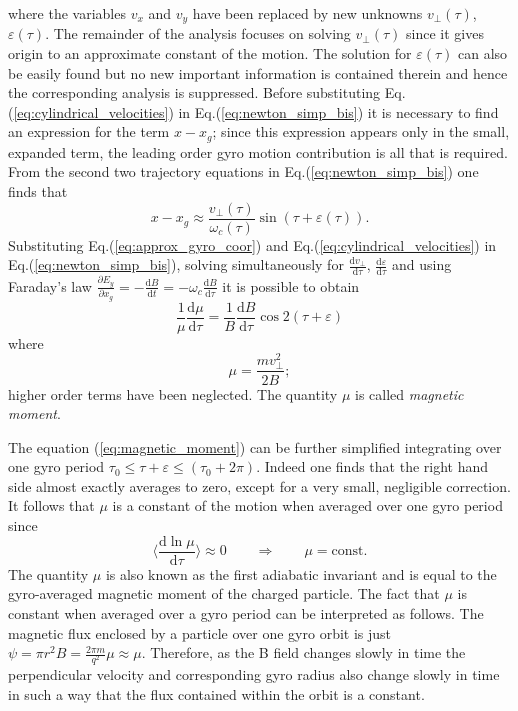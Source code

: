 where the variables $v_x$ and $v_y$ have been replaced by new unknowns $v_{\perp}(\tau)$, $\varepsilon(\tau)$. The remainder of the analysis focuses on solving $v_{\perp}(\tau)$ since it gives origin to an approximate constant of the motion. The solution for $\varepsilon(\tau)$ can also be easily found but no new important information is contained therein and hence the corresponding analysis is suppressed. Before substituting Eq.(\ref{eq:cylindrical_velocities}) in Eq.(\ref{eq:newton_simp_bis}) it is necessary to find an expression for the term $x-x_g$; since this expression appears only in the small, expanded term, the leading order gyro motion contribution is all that is required. From the second two trajectory equations in Eq.(\ref{eq:newton_simp_bis}) one finds that
\begin{equation}\label{eq:approx_gyro_coor}
  x-x_g\approx\frac{v_{\perp}(\tau)}{\omega_c(\tau)}\sin(\tau+\varepsilon(\tau)).
\end{equation}
Substituting Eq.(\ref{eq:approx_gyro_coor}) and Eq.(\ref{eq:cylindrical_velocities}) in Eq.(\ref{eq:newton_simp_bis}), solving simultaneously for $\frac{\mathrm{d}v_{\perp}}{\mathrm{d}\tau}$, $\frac{\mathrm{d}\varepsilon}{\mathrm{d}\tau}$ and using Faraday's law $\frac{\partial E_y}{\partial x_g}=-\frac{\mathrm{d}B}{\mathrm{d}t}=-\omega_c\frac{\mathrm{d}B}{\mathrm{d}\tau}$ it is possible to obtain
\begin{equation}\label{eq:magnetic_moment}
  \frac{1}{\mu}\frac{\mathrm{d}\mu}{\mathrm{d}\tau}=\frac{1}{B}\frac{\mathrm{d}B}{\mathrm{d}\tau}\cos 2(\tau+\varepsilon)
\end{equation}
where
\begin{equation}
  \mu=\frac{mv^2_{\perp}}{2B};
\end{equation}
higher order terms have been neglected. The quantity $\mu$ is called \textit{magnetic moment}.
\medskip

The equation (\ref{eq:magnetic_moment}) can be further simplified integrating over one gyro period $\tau_0\leq\tau +\varepsilon\leq(\tau_0+2\pi)$. Indeed one finds that the right hand side almost exactly averages to zero, except for a very small, negligible correction. It follows that $\mu$ is a constant of the motion when averaged over one gyro period since
\begin{equation}
  \langle\frac{\mathrm{d}\ln\mu}{\mathrm{d}\tau}\rangle\approx0\qquad\Longrightarrow\qquad \mu=\mathrm{const}.
\end{equation}
The quantity $\mu$ is  also known as the first adiabatic invariant and is equal to the gyro-averaged magnetic moment of the charged particle. The fact that $\mu$ is constant when averaged over a gyro period can be interpreted as follows. The magnetic flux enclosed by a particle over one gyro orbit is just $\psi=\pi r^2B=\frac{2\pi m}{q^2}\mu\approx\mu$. Therefore, as the B field changes slowly in time the perpendicular velocity and corresponding gyro radius also change slowly in time in such a way that the flux contained within the orbit is a constant.

